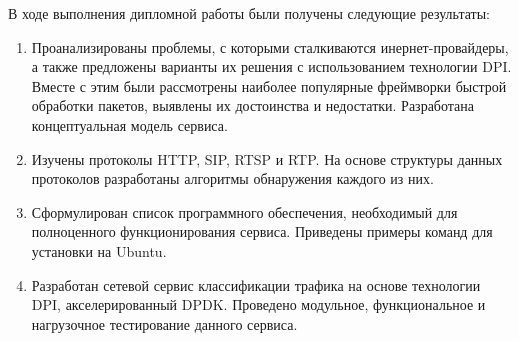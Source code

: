 \Conclusion
В ходе выполнения дипломной работы были получены следующие результаты:
\begin{enumerate}[1.]
\item Проанализированы проблемы, с которыми сталкиваются инернет-провайдеры, а также предложены варианты их решения с использованием технологии DPI. Вместе с этим были рассмотрены наиболее популярные фреймворки быстрой обработки пакетов, выявлены их достоинства и недостатки. Разработана концептуальная модель сервиса.
\item Изучены протоколы HTTP, SIP, RTSP и RTP. На основе структуры данных протоколов разработаны алгоритмы обнаружения каждого из них.
\item Сформулирован список программного обеспечения, необходимый для полноценного функционирования сервиса. Приведены примеры команд для установки на Ubuntu.
\item Разработан сетевой сервис классификации трафика на основе технологии DPI, акселерированный DPDK. Проведено модульное, функциональное и нагрузочное тестирование данного сервиса.
\end{enumerate}

